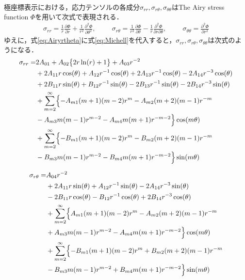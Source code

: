 極座標表示における，応力テンソルの各成分$\sigma_{rr},\sigma_{r\theta},\sigma_{\theta\theta}$はThe Airy stress function $\Phi$を用いて次式で表現される．
\begin{align}
\sigma_{rr}=\frac{1}{r}\frac{\partial \Phi}{\partial r}
+\frac{1}{r^2}\frac{\partial^2 \Phi}{\partial \theta^2},\hspace{1cm}
\sigma_{r\theta}=\frac{1}{r^2}\frac{\partial \Phi}{\partial \theta}
-\frac{1}{r}\frac{\partial^2 \Phi}{\partial r\partial \theta},\hspace{1cm}
\sigma_{\theta\theta}=\frac{\partial^2 \Phi}{\partial r^2}
\label{eq:Airyrtheta}
\end{align}
ゆえに，式\eqref{eq:Airyrtheta}に式\eqref{eq:Michell}を代入すると，$\sigma_{rr},\sigma_{r\theta},\sigma_{\theta\theta}$は次式のようになる．
\begin{align}
\sigma_{rr} =&2A_{01}
+A_{02}\bigl\{ 2r\ln(r)+1\bigr\}
+A_{03}r^{-2}
\nonumber
\\
&+2A_{11}r\cos(\theta)
+A_{12}r^{-1}\cos(\theta)
+2A_{13}r^{-1}\cos(\theta)
-2A_{14}r^{-3}\cos(\theta)
\nonumber
\\
&+2B_{11}r\sin(\theta)
+B_{12}r^{-1}\sin(\theta)
-2B_{13}r^{-1}\sin(\theta)
-2B_{14}r^{-3}\sin(\theta)
\nonumber
\\
&+\sum_{m=2}^{\infty}\Bigl\{-A_{m1}(m+1)(m-2)r^{m}
-A_{m2}(m+2)(m-1)r^{-m}
\nonumber
\\
&-A_{m3}m(m-1)r^{m-2}
-A_{m4}m(m+1)r^{-m-2}\Bigr\}\cos(m\theta)
\nonumber
\\
&+\sum_{m=2}^{\infty}\Bigl\{-B_{m1}(m+1)(m-2)r^{m}
-B_{m2}(m+2)(m-1)r^{-m}
\nonumber
\\
&-B_{m3}m(m-1)r^{m-2}
-B_{m4}m(m+1)r^{-m-2}\Bigr\}\sin(m\theta)
\label{eq:SigmaRR}
\end{align}

\begin{align}
\sigma_{r\theta} =&A_{04}r^{-2}
\nonumber
\\
&+2A_{11}r\sin(\theta)
+A_{12}r^{-1}\sin(\theta)
-2A_{14}r^{-3}\sin(\theta)
\nonumber
\\
&-2B_{11}r\cos(\theta)
-B_{12}r^{-1}\cos(\theta)
+2B_{14}r^{-3}\cos(\theta)
\nonumber
\\
&+\sum_{m=2}^{\infty}\Bigl\{A_{m1}(m+1)(m-2)r^{m}
-A_{m2}(m+2)(m-1)r^{-m}
\nonumber
\\
&+A_{m3}m(m-1)r^{m-2}
-A_{m4}m(m+1)r^{-m-2}\Bigr\}\cos(m\theta)
\nonumber
\\
&+\sum_{m=2}^{\infty}\Bigl\{-B_{m1}(m+1)(m-2)r^{m}
+B_{m2}(m+2)(m-1)r^{-m}
\nonumber
\\
&-B_{m3}m(m-1)r^{m-2}
+B_{m4}m(m+1)r^{-m-2}\Bigr\}\sin(m\theta)
\label{eq:SigmaRTh}
\end{align}

